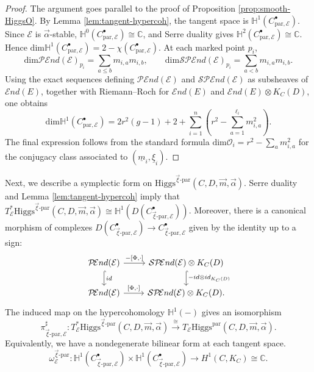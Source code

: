 \documentclass[11pt]{amsart}
\theoremstyle{plain}
\theoremstyle{definition}
\theoremstyle{remark}
\newcommand{\C}{\mathbb C}
\newcommand{\End}{\mathcal E nd}
\newcommand{\HH}{\mathbb H}
\newcommand{\PEnd}{\mathcal P\!\End}
\newcommand{\SPEnd}{\mathcal{SP}\!\End}
\newcommand{\cO}{\mathcal O}
\newcommand{\Higgs}{\mathrm{Higgs}}
\def\C{\mathbb{C}}
\def\a{\alpha}
\def\dim{\mathrm{dim}}
\def\uxi{{\underline{\xi}}}
\def\vxi{\vec{\xi}}
\def\vm{\vec{m}}
\def\va{\vec{\a}}
\def\um{{\underline{m}}}
\begin{document}
\begin{proof}
	The argument goes parallel to the proof of Proposition \ref{prop:smooth-HiggsO}. By Lemma \ref{lem:tangent-hypercoh}, the tangent space is $\HH^1(C_{\text{par},\mathcal E}^\bullet)$. Since $\mathcal{E}$ is $\va$-stable, $\HH^0(C_{\text{par},\mathcal E}^\bullet)\cong \C$, and Serre duality gives $\HH^2(C_{\text{par},\mathcal E}^\bullet)\cong \C$. Hence
	$\dim \HH^1(C_{\text{par},\mathcal E}^\bullet)=2-\chi(C_{\text{par},\mathcal E}^\bullet)$. At each marked point $p_i$,
	\[
	\dim\PEnd(\mathcal E)_{p_i}=\sum_{a\leq b}m_{i,a}m_{i,b},
	\qquad
	\dim\SPEnd(\mathcal E)_{p_i}=\sum_{a<b}m_{i,a}m_{i,b}.
	\]
	Using the exact sequences defining $\PEnd(\mathcal E)$ and $\SPEnd(\mathcal E)$ as subsheaves of $\End(E)$, together with Riemann--Roch for $\End(E)$ and $\End(E)\otimes K_C(D)$, one obtains
	\[
	\dim \HH^1(C_{\text{par},\mathcal E}^\bullet)
	=
	2r^2(g-1)+2+\sum_{i=1}^n\left(r^2-\sum_{a=1}^{\ell_i}m_{i,a}^2\right).
	\]
	The final expression follows from the standard formula
	$\dim \cO_i=r^2-\sum_a m_{i,a}^2$ for the conjugacy class associated to $(\um_i,\uxi_i)$.
\end{proof}

Next, we describe a symplectic form on $\Higgs^{\vxi\text{-par}}(C,D,\vm,\va)$. Serre duality and Lemma \ref{lem:tangent-hypercoh} imply that $T^*_\mathcal E\Higgs^{\vxi\text{-par}}(C,D,\vm,\va) \cong \mathbb{H}^1(D(C^\bullet_{\vxi\text{-par},\mathcal E}))$. Moreover, there is a canonical morphism of complexes $D(C^\bullet_{\vxi\text{-par},\mathcal E}) \to C^\bullet_{\vxi\text{-par},\mathcal E}$ given by the identity up to a sign:
\begin{equation}\label{e:xipar serredual map}
\begin{tikzcd}
    \PEnd(\mathcal E)
    \arrow[r, "{-[\Phi,\cdot]}"]
    \arrow[d, hook, "id"]
    &
    \SPEnd(\mathcal E)\otimes K_C(D)
    \arrow[d, hook, "-id \otimes id_{K_C(D)}"]
    \\
    \PEnd(\mathcal E)
    \arrow[r, "{[\Phi,\cdot]}"]
    &
    \SPEnd(\mathcal E)\otimes K_C(D).
\end{tikzcd}
\end{equation}
The induced map on the hypercohomology $\mathbb{H}^1(-)$ gives an isomorphism 
\begin{equation}\label{e:xipar serre dual}
    \pi^\sharp_{\vxi\text{-par},\mathcal{E}}:T^*_\mathcal E\Higgs^{\vxi\text{-par}}(C,D,\vm,\va) \xrightarrow{\cong} T_{\mathcal E}\Higgs^{\text{par}}(C,D,\vm,\va).
\end{equation}
Equivalently, we have a nondegenerate  bilinear form at each tangent space. 
\[
\omega^{\vxi\text{-par}}_{\mathcal E}:
\HH^1(C_{\vxi\text{-par},\mathcal E}^\bullet)\times
\HH^1(C_{\vxi\text{-par},\mathcal E}^\bullet)
\longrightarrow
H^1(C,K_C)\cong \C.
\]
\end{document}
